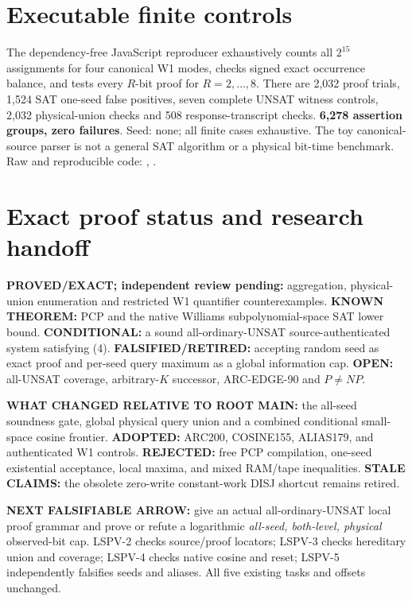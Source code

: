 \documentclass[11pt]{article}
\begin{document}
\section{Executable finite controls}
The dependency-free JavaScript reproducer exhaustively
counts all $2^{15}$ assignments for four canonical
W1 modes, checks signed exact occurrence balance,
and tests every $R$-bit proof for $R=2,\ldots,8$.
There are 2,032 proof trials, 1,524 SAT
one-seed false positives, seven complete UNSAT
witness controls, 2,032 physical-union checks
and 508 response-transcript checks.
\textbf{6,278 assertion groups, zero failures}.
Seed: none; all finite cases exhaustive.
The toy canonical-source parser is not a general
SAT algorithm or a physical bit-time benchmark.
Raw and reproducible code:
,
.


\section{Exact proof status and research handoff}
\textbf{PROVED/EXACT; independent review pending:}
aggregation, physical-union enumeration and
restricted W1 quantifier counterexamples.
\textbf{KNOWN THEOREM:} PCP and the native Williams
subpolynomial-space SAT lower bound.
\textbf{CONDITIONAL:} a sound all-ordinary-UNSAT
source-authenticated system satisfying (4).
\textbf{FALSIFIED/RETIRED:} accepting random seed
as exact proof and per-seed query maximum as a
global information cap.
\textbf{OPEN:} all-UNSAT coverage, arbitrary-$K$
successor, ARC-EDGE-90 and $P\ne NP$.

\textbf{WHAT CHANGED RELATIVE TO ROOT MAIN:}
the all-seed soundness gate, global physical
query union and a combined conditional
small-space cosine frontier.
\textbf{ADOPTED:} ARC200, COSINE155, ALIAS179,
and authenticated W1 controls.
\textbf{REJECTED:} free PCP compilation,
one-seed existential acceptance, local maxima,
and mixed RAM/tape inequalities.
\textbf{STALE CLAIMS:} the obsolete zero-write
constant-work DISJ shortcut remains retired.

\textbf{NEXT FALSIFIABLE ARROW:}
give an actual all-ordinary-UNSAT local
proof grammar and prove or refute a
logarithmic \emph{all-seed, both-level,
physical} observed-bit cap. LSPV-2 checks
source/proof locators; LSPV-3 checks
hereditary union and coverage; LSPV-4
checks native cosine and reset; LSPV-5
independently falsifies seeds and aliases.
All five existing tasks and offsets unchanged.
\end{document}
